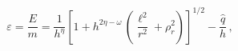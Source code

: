 \begin{equation} \label{energia3}
    \varepsilon = \frac{E}{m} = \frac{1}{h^\eta}
    \left[ 1 + h^{2\eta - \omega} \,
    \left( \frac{\ell^2}{r^2} + \rho_r^2 \right)
    \right]^{1/2} - \frac{\hat{q}}{h}
    \, ,
\end{equation}

